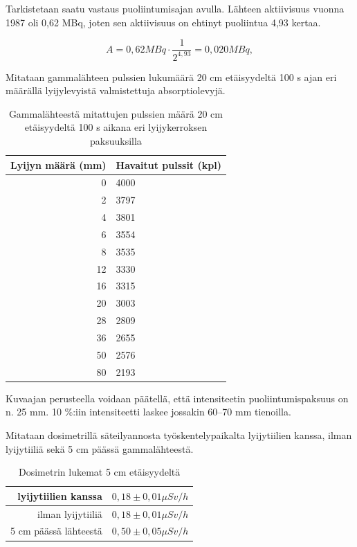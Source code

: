 \documentclass[a4paper,11pt]{article}
\begin{document}
Tarkistetaan saatu vastaus puoliintumisajan avulla. Lähteen aktiivisuus vuonna 1987 oli 0,62 MBq, joten sen aktiivisuus on ehtinyt puoliintua 4,93 kertaa. 

\begin{equation}
  A = 0,62 {MBq} \cdot \frac{1}{2^{4,93}} = 0,020 {MBq} ,
\end{equation}

Mitataan gammalähteen pulssien lukumäärä 20 cm etäisyydeltä 100 s ajan eri määrällä lyijylevyistä valmistettuja absorptiolevyjä. 

\begin{table}[H]
\begin{center}
\caption{Gammalähteestä mitattujen pulssien määrä 20 cm etäisyydeltä 100 s aikana eri lyijykerroksen paksuuksilla}
\begin{tabular}{ | r | l | }
  \hline
Lyijyn määrä (mm) & Havaitut pulssit (kpl) \\ \hline
0 & 4000 \\ \hline
2 & 3797 \\ \hline
4 & 3801 \\ \hline
6 & 3554 \\ \hline
8 & 3535 \\ \hline
12 & 3330 \\ \hline
16 & 3315 \\ \hline
20 & 3003 \\ \hline
28 & 2809 \\ \hline
36 & 2655 \\ \hline
50 & 2576 \\ \hline
80 & 2193 \\ \hline

\end{tabular}
\end{center}
\end{table}

Kuvaajan perusteella voidaan päätellä, että intensiteetin puoliintumispaksuus on n. 25 mm. 10 \%:iin intensiteetti laskee jossakin 60--70 mm tienoilla. 

Mitataan dosimetrillä säteilyannosta työskentelypaikalta lyijytiilien kanssa, ilman lyijytiiliä sekä 5 cm päässä gammalähteestä. 

\begin{table}[H]
\begin{center}
\caption{Dosimetrin lukemat 5 cm etäisyydeltä}
\begin{tabular}{ | r | l | }
  \hline
  lyijytiilien kanssa & $0,18 \pm 0,01 \mu Sv /h$ \\ \hline
  ilman lyijytiiliä & $0,18 \pm 0,01 \mu Sv /h$ \\ \hline
  5 cm päässä lähteestä & $0,50 \pm 0,05 \mu Sv /h$ \\ \hline
\end{tabular}
\end{center}
\end{table}
\end{document}
